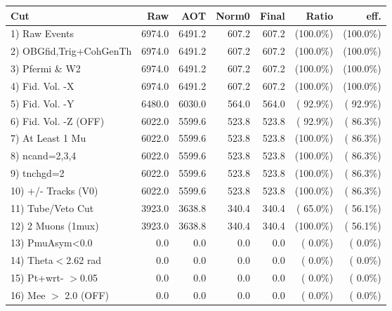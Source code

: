  \begin{table}[h!]\centering
 \begin{tabular}{||l||r|r|r|r|r|r||}
 \hline
 \hline
 Cut & Raw & AOT & Norm0 & Final & Ratio & eff.       \\
 \hline
  1) Raw Events           &       6974.0 &       6491.2 &        607.2 &        607.2 & (100.0\%) & (100.0\%) \\
  2) OBGfid,Trig+CohGenTh &       6974.0 &       6491.2 &        607.2 &        607.2 & (100.0\%) & (100.0\%) \\
  3) Pfermi \& W2         &       6974.0 &       6491.2 &        607.2 &        607.2 & (100.0\%) & (100.0\%) \\
  4) Fid. Vol. -X         &       6974.0 &       6491.2 &        607.2 &        607.2 & (100.0\%) & (100.0\%) \\
  5) Fid. Vol. -Y         &       6480.0 &       6030.0 &        564.0 &        564.0 & ( 92.9\%) & ( 92.9\%) \\
  6) Fid. Vol. -Z (OFF)   &       6022.0 &       5599.6 &        523.8 &        523.8 & ( 92.9\%) & ( 86.3\%) \\
  7) At Least 1 Mu        &       6022.0 &       5599.6 &        523.8 &        523.8 & (100.0\%) & ( 86.3\%) \\
  8) ncand=2,3,4          &       6022.0 &       5599.6 &        523.8 &        523.8 & (100.0\%) & ( 86.3\%) \\
  9) tnchgd=2             &       6022.0 &       5599.6 &        523.8 &        523.8 & (100.0\%) & ( 86.3\%) \\
 10) +/- Tracks (V0)      &       6022.0 &       5599.6 &        523.8 &        523.8 & (100.0\%) & ( 86.3\%) \\
 11) Tube/Veto Cut        &       3923.0 &       3638.8 &        340.4 &        340.4 & ( 65.0\%) & ( 56.1\%) \\
 12) 2 Muons (1mux)       &       3923.0 &       3638.8 &        340.4 &        340.4 & (100.0\%) & ( 56.1\%) \\
 13) PmuAsym<0.0          &          0.0 &          0.0 &          0.0 &          0.0 & (  0.0\%) & (  0.0\%) \\
 14) Theta$<$2.62 rad     &          0.0 &          0.0 &          0.0 &          0.0 & (  0.0\%) & (  0.0\%) \\
 15) Pt+wrt- $>$0.05      &          0.0 &          0.0 &          0.0 &          0.0 & (  0.0\%) & (  0.0\%) \\
 16) Mee $>$ 2.0  (OFF)   &          0.0 &          0.0 &          0.0 &          0.0 & (  0.0\%) & (  0.0\%) \\

\end{tabular}
\end{table}
